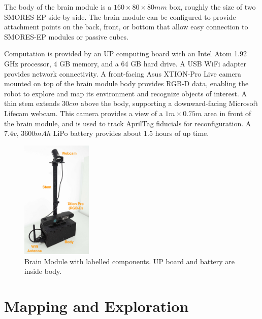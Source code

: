 \documentclass[conference]{IEEEtran}
\begin{document}
The body of the brain module is a $160\times80\times80mm$ box, roughly the size of two SMORES-EP side-by-side.  The brain module can be configured to provide attachment points on the back, front, or bottom that allow easy connection to SMORES-EP modules or passive cubes.

Computation is provided by an UP computing board with an Intel Atom 1.92 GHz processor, 4 GB memory, and a 64 GB hard drive. A USB WiFi adapter provides network connectivity. A front-facing Asus XTION-Pro Live camera mounted on top of the brain module body provides RGB-D data, enabling the robot to explore and map its environment and recognize objects of interest.  A thin stem extends $30cm$ above the body, supporting a downward-facing Microsoft Lifecam webcam.  This camera provides a view of a  $1m\times0.75m$ area in front of the brain module, and is used to track AprilTag \cite{olson2011apriltag} fiducials for reconfiguration. A $7.4v$, $3600mAh$ LiPo battery provides about 1.5 hours of up time.
%
\begin{figure}
\begin{center}
\includegraphics[width=0.3\textwidth]{images/sensor_module2.jpg}
\caption{Brain Module with labelled components.  UP board and battery are inside body.      }
\label{fig:sensor-module}
\end{center}
\vspace{-2em}
\end{figure}

\section{Mapping and Exploration}
\label{sec:exploration}
%
\end{document}
